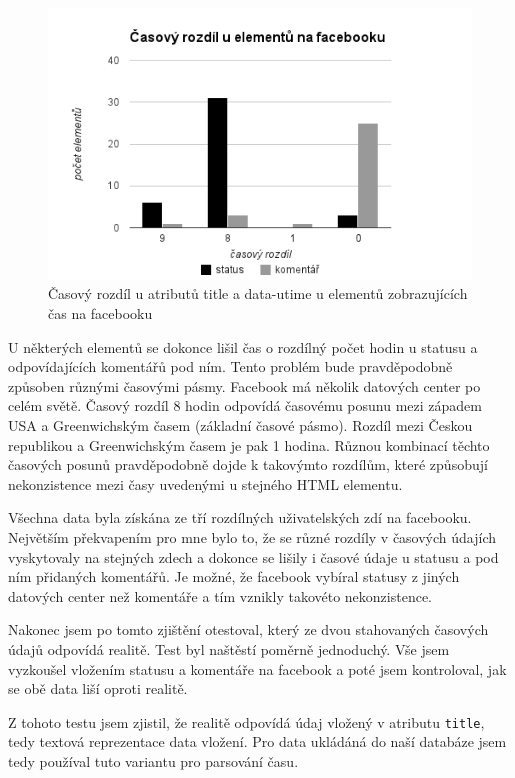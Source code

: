 \documentclass[thesis=M,czech]{FITthesis}[2013/05/10]
\begin{document}
\begin{figure}[h]
\begin{center}
\includegraphics[width=5in]{figures/time-difference.png}
\caption{Časový rozdíl u atributů title a data-utime u elementů zobrazujících čas na facebooku}
\label{fig:timeDifference}
\end{center}
\end{figure}

U některých elementů se dokonce lišil čas o rozdílný počet hodin u statusu a odpovídajících komentářů pod ním. Tento problém bude pravděpodobně způsoben různými časovými pásmy. Facebook má několik datových center po  celém světě. Časový rozdíl 8 hodin odpovídá časovému posunu mezi západem USA a Greenwichským časem (základní časové pásmo). Rozdíl mezi Českou republikou a Greenwichským časem je pak 1 hodina. Různou kombinací těchto časových posunů pravděpodobně dojde k takovýmto rozdílům, které způsobují nekonzistence mezi časy uvedenými u stejného HTML elementu. 

Všechna data byla získána ze tří rozdílných uživatelských zdí na facebooku. Největším překvapením pro mne bylo to, že se různé rozdíly v časových údajích vyskytovaly na stejných zdech a dokonce se lišily i časové údaje u statusu a pod ním přidaných komentářů.  Je možné, že facebook vybíral statusy z jiných datových center než komentáře a tím vznikly takovéto nekonzistence.

Nakonec jsem po tomto zjištění otestoval, který ze dvou stahovaných časových údajů odpovídá realitě. Test byl naštěstí poměrně jednoduchý. Vše jsem vyzkoušel vložením statusu a komentáře na facebook a poté jsem kontroloval, jak se obě data liší oproti realitě. 

Z tohoto testu jsem zjistil, že realitě odpovídá údaj vložený v atributu \verb|title|, tedy textová reprezentace data vložení. Pro data ukládáná do naší databáze jsem tedy používal tuto variantu pro parsování času.
\end{document}
